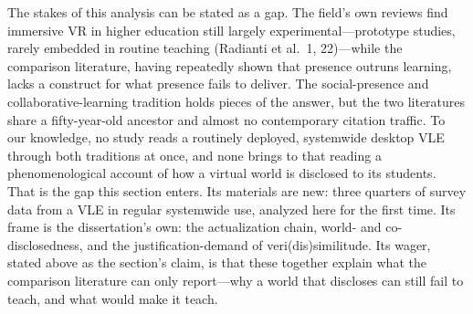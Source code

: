 
The stakes of this analysis can be stated as a gap. The field's own reviews find
immersive VR in higher education still largely experimental---prototype studies,
rarely embedded in routine teaching (Radianti et al.\ 1, 22)---while the
comparison literature, having repeatedly shown that presence outruns learning,
lacks a construct for what presence fails to deliver. The social-presence and
collaborative-learning tradition holds pieces of the answer, but the two
literatures share a fifty-year-old ancestor and almost no contemporary citation
traffic. To our knowledge, no study reads a routinely deployed, systemwide
desktop VLE through both traditions at once, and none brings to that reading a
phenomenological account of how a virtual world is disclosed to its students.
That is the gap this section enters. Its materials are new: three quarters of
survey data from a VLE in regular systemwide use, analyzed here for the first
time. Its frame is the dissertation's own: the actualization chain, world- and
co-disclosedness, and the justification-demand of veri(dis)similitude. Its
wager, stated above as the section's claim, is that these together explain what
the comparison literature can only report---why a world that discloses can still
fail to teach, and what would make it teach.


